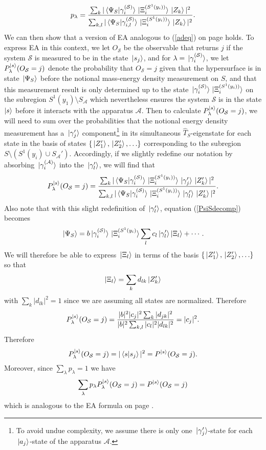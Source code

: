 \begin{equation}\label{plambda}
p_{\lambda}=\frac{\sum_k |\ip*{\Psi_S}{\gamma_i^{(\mathcal{S})}}\ket*{\Xi_i^{(S^1(y_i))}}\ket*{Z_k}|^2}{\sum_{k,l} |\ip*{\Psi_S}{\gamma_{i,l}^{(\mathcal{S})}}\ket*{\Xi_i^{(S^1(y_i))}}\ket*{Z_k}|^2}.
\end{equation}
We can then show that a version of EA analogous to (\ref{adeq}) on page \pageref{adeq} holds. To express EA in this context, we let
$O_{\mathcal{S}}$ be the observable that returns $j$ if the system $\mathcal{S}$ is measured to be in the state $\ket*{s_j}$, and for $\lambda = \ket*{\gamma_i^{(\mathcal{S})}}$, we let $P_\lambda^{\ket{s}}(O_{\mathcal{S}}=j)$ denote the probability that $O_{\mathcal{S}}=j$ given that the hypersurface is in state $\ket*{\Psi_S}$ before the notional mass-energy density measurement on $S$, and that this measurement result is only determined up to the state $\ket*{\gamma_i^{(\mathcal{S})}}\ket*{\Xi_i^{(S^1(y_i))}}$ on the subregion $S^1(y_1)\setminus S_{\mathcal{A}}$ which nevertheless ensures the system $\mathcal{S}$ is in the  state $\ket{s}$ before it interacts with the apparatus $\mathcal{A}$. Then to calculate $P_\lambda^{\ket{s}}(O_{\mathcal{S}}=j)$, we will need to sum over the probabilities that the notional energy density measurement has a $\ket*{\gamma_j'}$ component\footnote{To avoid undue complexity, we assume there is only one $\ket*{\gamma_j'}$-state for each $\ket*{a_j}$-state of the apparatus $\mathcal{A}$.} in its simultaneous $\hat{T}_S$-eigenstate for each state in the basis of states  $\{\ket*{Z_1'},\ket*{Z_2'},\ldots\}$ corresponding to the subregion $S\setminus(S^{1}(y_i)\cup S_{\mathcal{A}}')$. Accordingly, if we slightly redefine our notation by absorbing $\ket*{\gamma_i^{(\mathcal{A})}}$ into the $\ket*{\gamma_l'}$, we will find that   
$$P_\lambda^{\ket{s}}(O_{\mathcal{S}}=j)=\frac{\sum_k|\ip*{\Psi_S}{\gamma_i^{(\mathcal{S})}}\ket*{\Xi_i^{(S^1(y_i))}}\ket*{\gamma_j'}\ket*{Z_k'}|^2}{\sum_{k,l}|\ip*{\Psi_S}{\gamma_i^{(\mathcal{S})}}\ket*{\Xi_i^{(S^1(y_i))}}\ket*{\gamma_l'}\ket*{Z_k'}|^2}.$$ 
Also note that with this slight redefinition of $\ket*{\gamma_l'}$,  equation (\ref{PsiSdecomp}) becomes
$$\ket*{\Psi_S}=b\ket*{\gamma_i^{(\mathcal{S})}}\ket*{\Xi_i^{(S^1(y_i)}}\sum_lc_l\ket{\gamma_l'}\ket{\Xi_l}+\cdots.$$
We will therefore be able to express
$\ket*{\Xi_l}$ in terms of the basis $\{\ket*{Z_1'}, \ket*{Z_2'},\ldots  \}$ so that 
$$\ket{\Xi_l}= \sum_k d_{lk}\ket*{Z_k'}$$
with $\sum_{k}|d_{lk}|^2=1$ since we are assuming all states are normalized. Therefore
$$P_\lambda^{\ket{s}}(O_{\mathcal{S}}=j)=\frac{|b|^2|c_j|^2\sum_k |d_{jk}|^2}{|b|^2\sum_{k,l} |c_l|^2 |d_{lk}|^2}= |c_j|^2.$$
Therefore $$P_\lambda^{\ket{s}}(O_{\mathcal{S}}=j)=|\ip*{s}{s_j}|^2=P^{\ket{s}}(O_{\mathcal{S}}=j).$$ Moreover, since $\sum_\lambda p_\lambda =1$ we have 
$$\sum_\lambda p_\lambda P_\lambda^{\ket{s}}(O_{\mathcal{S}}=j)= P^{\ket{s}}(O_{\mathcal{S}}=j)$$
which is analogous to the EA formula on page \pageref{adeq}.
